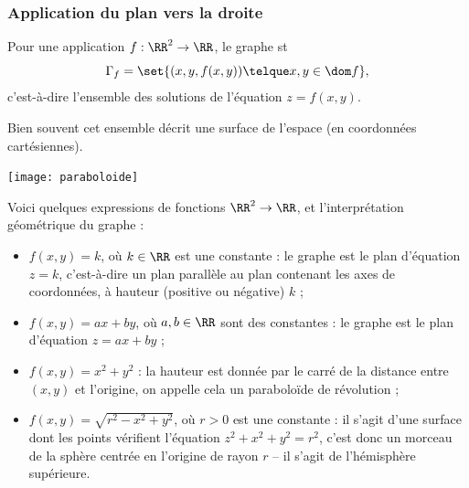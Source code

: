 \subsubsection{Application du plan vers la droite}
\begin{frame}
  \begin{remark*}
    Pour une application \(f : \RR^{2} \to \RR\), le graphe st
    \begin{equation*}
      \Gamma_{f} = \set{ (x,y,f(x,y)) \telque x,y \in \dom f },
    \end{equation*}\pause{}
    c'est-à-dire l'ensemble des solutions de l'équation \(z = f(x,y)\).\pause{}

    Bien souvent cet ensemble décrit une surface de l'espace (en coordonnées cartésiennes).
  \end{remark*}\pause{}
  \begin{center}
    \texttt{[image: paraboloide]}
  \end{center}
\end{frame}
\begin{frame}
  \begin{example}
    Voici quelques expressions de fonctions \(\RR^{2}\to \RR\), et l'interprétation géométrique du graphe :\pause{}
    \begin{itemize}
    \item \(f(x,y) = k\), où \(k \in \RR\) est une constante : le graphe est le plan d'équation \(z = k\), c'est-à-dire un plan parallèle au plan contenant les axes de coordonnées, à \og hauteur\fg{} (positive ou négative) \(k\) ;\pause{}
    \item \(f(x,y) = ax + by\), où \(a,b \in \RR\) sont des constantes : le graphe est le plan d'équation \(z = ax + by\) ;\pause{}
    \item \(f(x,y) = x^{2} + y^{2}\) : la hauteur est donnée par le carré de la distance entre \((x,y)\) et l'origine, on appelle cela un paraboloïde de révolution ;\pause{}
    \item \(f(x,y) = \sqrt{r^{2} - x^{2} + y^{2}}\), où \(r >0\) est une constante : il s'agit d'une surface dont les points vérifient l'équation \(z^{2} + x^{2} + y^{2} = r^{2}\), c'est donc un morceau de la sphère centrée en l'origine de rayon \(r\) -- il s'agit de l'hémisphère supérieure.\pause{}
    \end{itemize}
  \end{example}
\end{frame}

